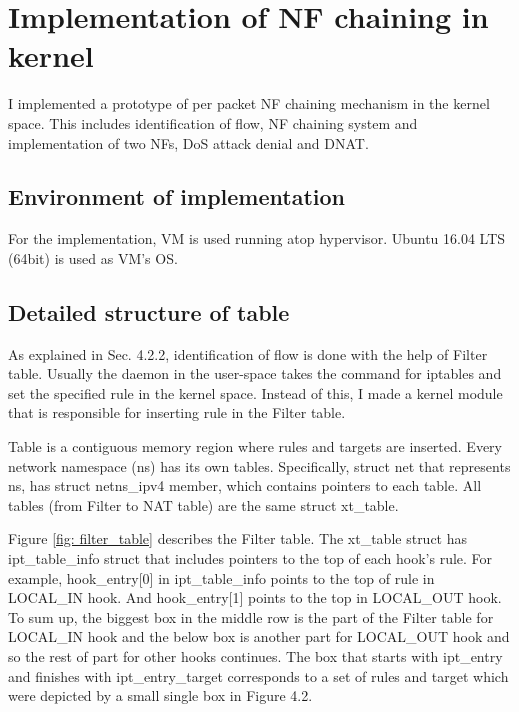 \section{Implementation of NF chaining in kernel}
I implemented a prototype of per packet NF chaining mechanism in the kernel space. This includes identification of flow, NF chaining system and implementation of two NFs, DoS attack denial and DNAT. 

\subsection{Environment of implementation}
For the implementation, VM is used running atop hypervisor. Ubuntu 16.04 LTS (64bit) is used as VM's OS. 

\subsection{Detailed structure of table}
As explained in Sec. 4.2.2, identification of flow is done with the help of Filter table. Usually the daemon in the user-space takes the command for iptables and set the specified rule in the kernel space. Instead of this, I made a kernel module that is responsible for inserting rule in the Filter table. 

Table is a contiguous memory region where rules and targets are inserted. Every network namespace (ns) has its own tables. Specifically, struct net that represents ns, has struct netns\_ipv4 member, which contains pointers to each table. All tables (from Filter to NAT table) are the same struct xt\_table. 

Figure \ref{fig: filter_table} describes the Filter table. The xt\_table struct has ipt\_table\_info struct that includes pointers to the top of each hook's rule. For example, hook\_entry[0] in ipt\_table\_info points to the top of rule in LOCAL\_IN hook. And hook\_entry[1] points to the top in LOCAL\_OUT hook. To sum up, the biggest box in the middle row is the part of the Filter table for LOCAL\_IN hook and the below box is another part for LOCAL\_OUT hook and so the rest of part for other hooks continues. The box that starts with ipt\_entry and finishes with ipt\_entry\_target corresponds to a set of rules and target which were depicted by a small single box in Figure 4.2. 

